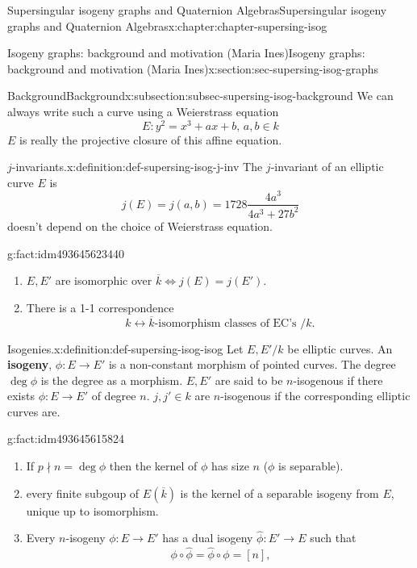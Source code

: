 \documentclass[oneside,10pt,]{book}
\newcommand{\terminology}[1]{\textbf{#1}}
\numberwithin{equation}{section}
\newcommand{\lb}{[}
\newcommand{\rb}{]}
\begin{document}
\begin{chapterptx}{Supersingular isogeny graphs and Quaternion Algebras}{}{Supersingular isogeny graphs and Quaternion Algebras}{}{}{x:chapter:chapter-supersing-isog}
\begin{sectionptx}{Isogeny graphs: background and motivation (Maria Ines)}{}{Isogeny graphs: background and motivation (Maria Ines)}{}{}{x:section:sec-supersing-isog-graphs}
\begin{subsectionptx}{Background}{}{Background}{}{}{x:subsection:subsec-supersing-isog-background}
We can always write such a curve using a Weierstrass equation%
\begin{equation*}
E\colon y^2=  x^3  + ax  +b,\,a,b    \in k
\end{equation*}
\(E\) is really the projective closure of this affine equation.%
\begin{definition}{\(j\)-invariants.}{x:definition:def-supersing-isog-j-inv}%
The \(j\)-invariant of an elliptic curve \(E\) is%
\begin{equation*}
j(E) = j(a,b) = 1728 \frac{4a^3}{4a^3 + 27b^2}
\end{equation*}
doesn't depend on the choice of Weierstrass equation.%
\end{definition}
\begin{fact}{}{}{g:fact:idm493645623440}%
%
\begin{enumerate}
\item{}\(E,E'\) are isomorphic over \(\overline k \iff j(E)  = j(E')\).%
\item{}There is a 1-1 correspondence%
\begin{equation*}
k \leftrightarrow \overline k \text{-isomorphism classes of EC's }/k\text{.}
\end{equation*}
%
\end{enumerate}
%
\end{fact}
\begin{definition}{Isogenies.}{x:definition:def-supersing-isog-isog}%
Let \(E,E'/k\) be elliptic curves. An \terminology{isogeny}, \(\phi \colon E\to E'\) is a non-constant morphism of pointed curves. The degree \(\deg \phi \) is the degree as a morphism. \(E,E'\) are said to be \(n\)-isogenous if there exists \(\phi\colon E\to E'\) of degree \(n\). \(j,j'\in k\) are \(n\)-isogenous if the corresponding elliptic curves are.%
\end{definition}
\begin{fact}{}{}{g:fact:idm493645615824}%
%
\begin{enumerate}
\item{}If \(p \nmid n = \deg \phi\) then the kernel of \(\phi\) has size \(n\) (\(\phi\) is separable).%
\item{}every finite subgoup of \(E(\overline k )\) is the kernel of a separable isogeny from \(E\), unique up to isomorphism.%
\item{}Every \(n\)-isogeny \(\phi\colon E \to E'\) has  a dual isogeny \(\hat \phi \colon E' \to E\) such that%
\begin{equation*}
\phi\circ \hat\phi = \hat\phi \circ \phi = \lb n \rb\text{,}

\end{equation*}
\end{enumerate}
\end{fact}
\end{subsectionptx}
\end{sectionptx}
\end{chapterptx}
\end{document}
